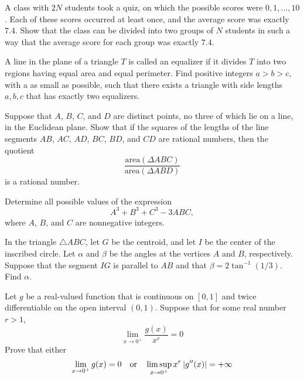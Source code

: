 \documentclass[12pt]{article}
\begin{document}
    \begin{exercise}[2017 A4]
        A class with $2N$ students took a quiz, on which the possible scores were $0, 1,\dots , 10$. Each of these scores occurred at least once, and the average score was exactly $7.4$. Show that the class can be divided into two groups of $N$ students in such a way that the average score for each group was exactly $7.4$. 
    \end{exercise}

    \begin{exercise}[2017 B5]
        A line in the plane of a triangle $T$ is called an equalizer if it divides $T$ into two regions having equal area and equal perimeter. Find positive integers $a > b > c$, with a as small as possible, such that there exists a triangle with side lengths $a, b, c$ that has exactly two equalizers.
    \end{exercise}
    
    \begin{exercise}[2018 A6]
        Suppose that $A$, $B$, $C$, and $D$ are distinct points, no three of which lie on a line, in the Euclidean plane. Show that if the squares of the lengths of the line segments $AB$, $AC$, $AD$, $BC$, $BD$, and $CD$ are rational numbers, then the quotient
        \[\frac{\textrm{area}(\Delta ABC)}{\textrm{area}(\Delta ABD)}\]
        is a rational number.
    \end{exercise}

    \begin{exercise}[2019 A1]
        Determine all possible values of the expression
        \[A^3+B^3+C^3-3ABC,\]
        where \(A\), \(B\), and \(C\) are nonnegative integers.
    \end{exercise}
    
    \begin{exercise}[2019 A2]
        In the triangle \(\triangle ABC\), let \(G\) be the centroid, and let \(I\) be the center of the inscribed circle.
        Let \(\alpha\) and \(\beta\) be the angles at the vertices \(A\) and \(B\), respectively.
        Suppose that the segment \(IG\) is parallel to \(AB\) and that \(\beta=2\tan^{-1}(1/3)\).
        Find \(\alpha\).
    \end{exercise}

    \begin{exercise}[2019 A6]
        Let $g$ be a real-valued function that is continuous on $[0,1]$ and twice differentiable on the open interval $(0,1)$. Suppose that for some real number $r>1$, 
        \[\lim_{x\to 0^+} \frac{g(x)}{x^r}=0\] Prove that either 
        \[\lim_{x\to 0^+} g(x)=0\quad\text{or}\quad\limsup_{x\to 0^+}x^r\left\lvert g''(x) \right\rvert = +\infty\]
    \end{exercise}
\end{document}
